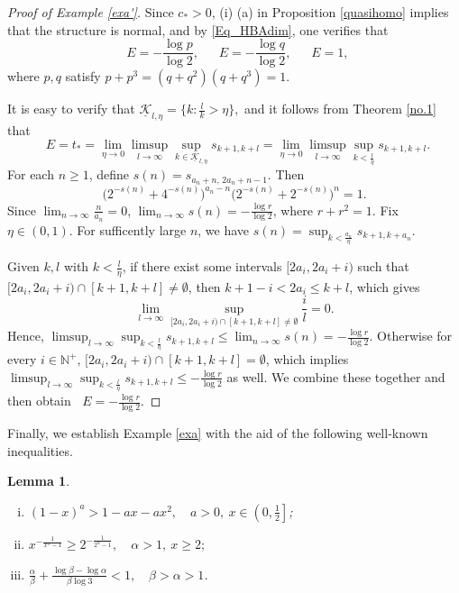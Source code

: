 \documentclass[12pt]{amsart}
\numberwithin{equation}{section}
\theoremstyle{plain}
\newtheorem{lemma}[theorem]{Lemma}
\theoremstyle{remark}
\theoremstyle{definition}
\newcommand{\uk}{\underline{\mathcal{K}}}
\newcommand{\N}{\mathbb{N}}
\newcommand{\f}{\frac}
\renewcommand{\ge}{\geqslant}
\renewcommand{\le}{\leqslant}
\renewcommand{\geq}{\geqslant}
\DeclareMathOperator{\dimh}{dim_H}
\DeclareMathOperator{\odimb}{\overline{dim}_B}
\DeclareMathOperator{\dima}{dim_A}
\DeclareMathOperator{\dimqa}{dim_{qA}}
\begin{document}
	\begin{proof}[Proof of Example \ref{exa'}]
		Since $c_*>0$, (i) (a) in Proposition \ref{quasihomo}  implies that the structure is normal, and by \eqref{Eq_HBAdim}, one verifies that  
		$$	
		\dimh E=-\f{\log p}{\log 2},\quad\odimb E=-\f{\log q}{\log 2} ,  \quad \dima E=1,
		$$
		where $p,q$ satisfy	$p+p^3=(q+q^2)(q+q^3)=1.$
		
		
		It is easy to verify that $\uk_{l,\eta} =\{k:\frac {l}{k}>\eta \},$ and 	it follows from Theorem \ref{no.1} that
		\[
		\dimqa E=t_*=\lim_{\eta\to 0}\limsup_{l\to\infty}\sup_{k\in \uk_{l,\eta}} s_{k+1,k+l}=\lim_{\eta\to 0}\limsup_{l\to\infty}\sup_{k< \f l\eta} s_{k+1,k+l}.
		\]
		For each $n\geq 1$, define  $s(n)= s_{a_n+n,\,2a_n+n-1}$. Then 
		\[
		\big( {2^{-s(n)}}+ {4^{-s(n)}}\big)^{a_n-n}\big( {2^{-s(n)}}+ {2^{-s(n)}}\big)^n=1.
		\]
		Since $\lim_{n\to\infty}\f {n}{a_n}=0$,  $\lim_{n\to\infty } s(n)= -\f{\log r}{\log 2}  $, where $r+r^2=1.$
		Fix $\eta\in (0,1)$. For sufficently large $n$, we have $  s(n)=		\sup_{k<\f{a_n}\eta}s_{k+1,k+a_n} . $
		
		
		
		Given $k,l$ with $k<\f l{\eta}$, if there exist some intervals $[2a_i,2a_i+i)$ such that $[2a_i,2a_i+i)\cap[k+1,k+l]\neq\emptyset$, then $k+1-i<2a_i\le k+l$, which gives
		\[
		\lim_{l\to\infty}\sup_{[2a_i,2a_i+i)\cap[k+1,k+l]\neq\emptyset}\f{i}{l}=0.
		\]
		Hence, $\limsup_{l\to\infty}\sup_{k< \f l\eta} s_{k+1,k+l}\le\lim_{n\to\infty } s(n)= -\f{\log r}{\log 2}$. 
		Otherwise for every $i\in \N^+$, $[2a_i,2a_i+i)\cap[k+1,k+l]=\emptyset$, which implies  $\limsup_{l\to\infty}\sup_{k< \f l\eta} s_{k+1,k+l}\le -\f{\log r}{\log 2}$ as well. We combine these together and then obtain $\dimqa E=-\f{\log r}{\log 2}. $
	\end{proof}
	
	Finally, we establish Example \ref{exa} with the aid of the following well-known inequalities.
	\begin{lemma}\label{ine}
		\begin{enumerate}[(i)]
			\item $(1-x)^a>1-ax-ax^2,\quad a>0,\ x\in \left(0,\f12\right]$;
			\item $x^{-\f{1 }{x^\alpha-1}}\ge 2^{-\f{1 }{2^\alpha-1}},\quad \alpha>1,\ x\ge 2;$ 
			\item $\f\alpha\beta+\f{\log\beta-\log\alpha}{\beta\log 3}<1,\quad \beta>\alpha>1$.
		\end{enumerate}
	\end{lemma}
	
\end{document}

